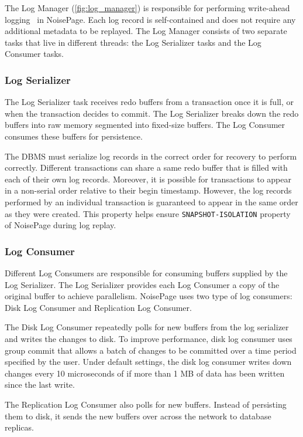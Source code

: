 \documentclass[12pt]{cmuthesis}
\begin{document}
The Log Manager (\cref{fig:log_manager}) is responsible for performing write-ahead logging~\cite{aries} in NoisePage. Each log record is self-contained and does not require any additional metadata to be replayed. The Log Manager consists of two separate tasks that live in different threads: the Log Serializer tasks and the Log Consumer tasks.

\subsubsection{Log Serializer}
The Log Serializer task receives redo buffers from a transaction once it is full, or when the transaction decides to commit. The Log Serializer breaks down the redo buffers into raw memory segmented into fixed-size buffers. The Log Consumer consumes these buffers for persistence.

The DBMS must serialize log records in the correct order for recovery to perform correctly. Different transactions can share a same redo buffer that is filled with each of their own log records. Moreover, it is possible for transactions to appear in a non-serial order relative to their begin timestamp. However, the log records performed by an individual transaction is guaranteed to appear in the same order as they were created. This property helps ensure \texttt{SNAPSHOT-ISOLATION} property of NoisePage during log replay.
\subsubsection{Log Consumer}
Different Log Consumers are responsible for consuming buffers supplied by the Log Serializer. The Log Serializer provides each Log Consumer a copy of the original buffer to achieve parallelism. NoisePage uses two type of log consumers: Disk Log Consumer and Replication Log Consumer.

The Disk Log Consumer repeatedly polls for new buffers from the log serializer and writes the changes to disk. To improve performance, disk log consumer uses group commit that allows a batch of changes to be committed over a time period specified by the user. Under default settings, the disk log consumer writes down changes every 10 microseconds of if more than 1 MB of data has been written since the last write.

The Replication Log Consumer also polls for new buffers. Instead of persisting them to disk, it sends the new buffers over across the network to database replicas.
\end{document}
